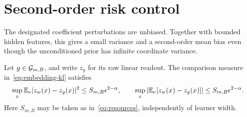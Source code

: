 \section{Second-order risk control}
The designated coefficient perturbations are unbiased. Together with bounded hidden features, this gives a small variance and a second-order mean bias even though the unconditioned prior has infinite coordinate variance.

\begin{lemma}\label{lem:perturbation}
Let $g\in\mathcal G_{m,B}$, and write $z_g$ for its raw linear readout. The comparison measure in~\eqref{eq:embedding-kl} satisfies
\begin{equation}
 \sup_x\mathbb E_\nu|z_w(x)-z_g(x)|^2
 \le S_{m,B}\epsilon^{2-\alpha},\qquad
 \sup_x\left|\mathbb E_\nu[z_w(x)-z_g(x)]\right|
 \le S_{m,B}\epsilon^{2-\alpha}.
 \label{eq:raw-moments}
\end{equation}
Here $S_{m,B}$ may be taken as in~\eqref{eq:resources}, independently of learner width.
\end{lemma}
